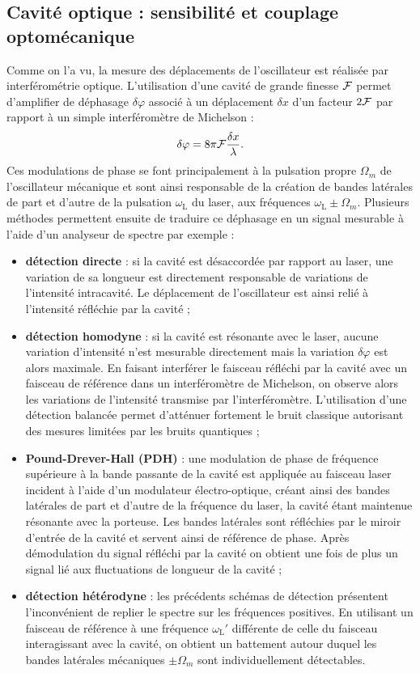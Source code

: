 \documentclass[12pt,a4paper]{article}
\begin{document}
\subsection{Cavité optique : sensibilité et couplage optomécanique}

Comme on l'a vu, la mesure des déplacements de l'oscillateur est réalisée par interférométrie optique.
L'utilisation d'une cavité de grande finesse $\cal{F}$ permet d'amplifier de déphasage $\delta\varphi$ associé à un déplacement $\delta x$ d'un facteur $2\cal{F}$ par rapport à un simple interféromètre de Michelson :
\begin{equation}
\delta \varphi = 8\pi{\cal{F}}\frac{\delta x}{\lambda}.
\end{equation}
Ces modulations de phase se font principalement à la pulsation propre $\Omega_m$ de l'oscillateur mécanique et sont ainsi responsable de la création de bandes latérales de part et d'autre de la pulsation $\omega_\mathrm{L}$ du laser, aux fréquences $\omega_\mathrm{L} \pm \Omega_m$.
Plusieurs méthodes permettent ensuite de traduire ce déphasage en un signal mesurable à l'aide d'un analyseur de spectre par exemple :
\begin{itemize}
\item \textbf{détection directe} : si la cavité est désaccordée par rapport au laser, une variation de sa longueur est directement responsable de variations de l'intensité intracavité.
Le déplacement de l'oscillateur est ainsi relié à l'intensité réfléchie par la cavité ;
\item \textbf{détection homodyne} : si la cavité est résonante avec le laser, aucune variation d'intensité n'est mesurable directement mais la variation $\delta \varphi$ est alors maximale.
En faisant interférer le faisceau réfléchi par la cavité avec un faisceau de référence dans un interféromètre de Michelson, on observe alors les variations de l'intensité transmise par l'interféromètre.
L'utilisation d'une détection balancée permet d'atténuer fortement le bruit classique autorisant des mesures limitées par les bruits quantiques ;
\item \textbf{Pound-Drever-Hall (PDH)} : une modulation de phase de fréquence supérieure à la bande passante de la cavité est appliquée au faisceau laser incident à l'aide d'un modulateur électro-optique, créant ainsi des bandes latérales de part et d'autre de la fréquence du laser, la cavité étant maintenue résonante avec la porteuse.
Les bandes latérales sont réfléchies par le miroir d'entrée de la cavité et servent ainsi de référence de phase.
Après démodulation du signal réfléchi par la cavité on obtient une fois de plus un signal lié aux fluctuations de longueur de la cavité ;
\item \textbf{détection hétérodyne} : les précédents schémas de détection présentent l'inconvénient de replier le spectre sur les fréquences positives.
En utilisant un faisceau de référence à une fréquence $\omega_\mathrm{L}'$ différente de celle du faisceau interagissant avec la cavité, on obtient un battement autour duquel les bandes latérales mécaniques $\pm \Omega_m$ sont individuellement détectables. 
\end{itemize}
\end{document}
